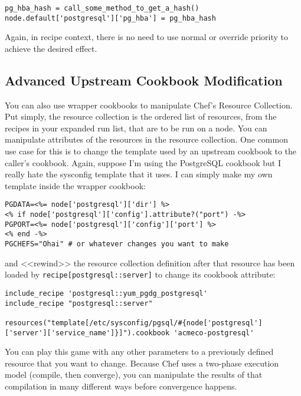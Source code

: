 \begin{lstlisting}[label=lst:wrapper-cookbook5]
pg_hba_hash = call_some_method_to_get_a_hash()
node.default['postgresql']['pg_hba'] = pg_hba_hash
\end{lstlisting}

Again, in recipe context, there is no need to use normal or override priority to achieve the desired effect.


\subsection{Advanced Upstream Cookbook Modification}

You can also use wrapper cookbooks to manipulate Chef's Resource Collection. Put simply, the resource collection is the ordered list of resources, from the recipes in your expanded run list, that are to be run on a node. You can manipulate attributes of the resources in the resource collection. One common use case for this is to change the template used by an upstream cookbook to the caller's cookbook. Again, suppose I'm using the PostgreSQL cookbook but I really hate the sysconfig template that it uses. I can simply make my own template inside the wrapper cookbook:

\begin{lstlisting}[label=lst:wrapper-cookbook6,caption=acmeco-postgresql/templates/pgsql.sysconfig.erb]
PGDATA=<%= node['postgresql']['dir'] %>
<% if node['postgresql']['config'].attribute?("port") -%>
PGPORT=<%= node['postgresql']['config']['port'] %>
<% end -%>
PGCHEFS="Ohai" # or whatever changes you want to make
\end{lstlisting}

and <<rewind>> the resource collection definition after that resource has been loaded by \lstinline!recipe[postgresql::server]! to change its cookbook attribute:

\begin{lstlisting}[label=lst:wrapper-cookbook7,caption=acmeco-postgresql/recipes/default.rb]
include_recipe 'postgresql::yum_pgdg_postgresql'
include_recipe "postgresql::server"

resources("template[/etc/sysconfig/pgsql/#{node['postgresql']['server']['service_name']}]").cookbook 'acmeco-postgresql'
\end{lstlisting}

You can play this game with any other parameters to a previously defined resource that you want to change. Because Chef uses a two-phase execution model (compile, then converge), you can manipulate the results of that compilation in many different ways before convergence happens.

